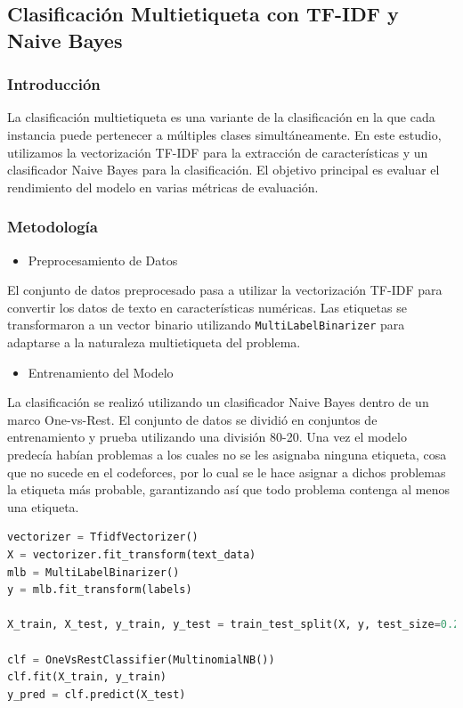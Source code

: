 \documentclass{article}
\begin{document}
\subsection{Clasificación Multietiqueta con TF-IDF y Naive Bayes}
\subsubsection{Introducción}
La clasificación multietiqueta es una variante de la clasificación en la que cada instancia puede pertenecer a múltiples clases simultáneamente. En este estudio, utilizamos la vectorización TF-IDF para la extracción de características y un clasificador Naive Bayes para la clasificación. El objetivo principal es evaluar el rendimiento del modelo en varias métricas de evaluación.
\subsubsection{Metodología}
\begin{itemize}
    \item Preprocesamiento de Datos
\end{itemize}
El conjunto de datos preprocesado pasa a utilizar la vectorización TF-IDF para convertir los datos de texto en características numéricas. Las etiquetas se transformaron a un vector binario utilizando \texttt{MultiLabelBinarizer} para adaptarse a la naturaleza multietiqueta del problema.

\begin{itemize}
    \item Entrenamiento del Modelo
\end{itemize}
La clasificación se realizó utilizando un clasificador Naive Bayes dentro de un marco One-vs-Rest. El conjunto de datos se dividió en conjuntos de entrenamiento y prueba utilizando una división 80-20. Una vez el modelo predecía habían problemas a los cuales no se les
asignaba ninguna etiqueta, cosa que no sucede en el codeforces, por lo cual se le hace asignar a dichos problemas la etiqueta más probable, garantizando así que todo problema contenga al menos una etiqueta.

\begin{lstlisting}[language=Python, caption=Naive Bayes]
vectorizer = TfidfVectorizer()
X = vectorizer.fit_transform(text_data)
mlb = MultiLabelBinarizer()
y = mlb.fit_transform(labels)

X_train, X_test, y_train, y_test = train_test_split(X, y, test_size=0.2, random_state=42)

clf = OneVsRestClassifier(MultinomialNB())
clf.fit(X_train, y_train)
y_pred = clf.predict(X_test)
\end{lstlisting}
\end{document}
